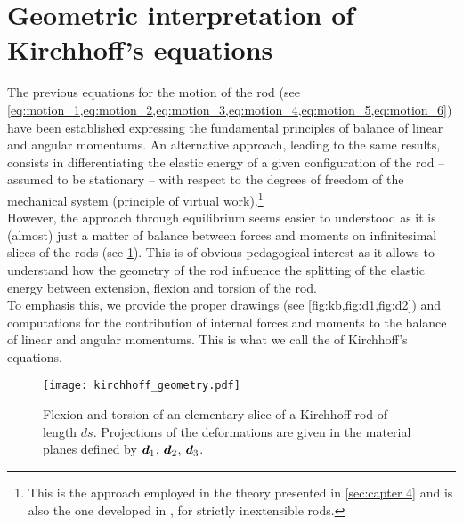 \clearpage
\section{Geometric interpretation of Kirchhoff's equations}

The previous equations for the motion of the rod (see \cref{eq:motion_1,eq:motion_2,eq:motion_3,eq:motion_4,eq:motion_5,eq:motion_6}) have been established expressing the fundamental principles of balance of linear and angular momentums. An alternative approach, leading to the same results, consists in differentiating the elastic energy of a given configuration of the rod -- assumed to be stationary -- with respect to the degrees of freedom of the mechanical system (principle of virtual work).\footnote{This is the approach employed in the theory presented in \cref{sec:capter 4} and is also the one developed in \cite{Audoly2010}, for strictly inextensible rods.} 
\\
However, the approach through equilibrium seems easier to understood as it is (almost) just a matter of balance between forces and moments on infinitesimal slices of the rods (see \cref{fig:slice}). This is of obvious pedagogical interest as it allows to understand how the geometry of the rod influence the splitting of the elastic energy between extension, flexion and torsion of the rod.
\\
To emphasis this, we provide the proper drawings (see \cref{fig:kb,fig:d1,fig:d2}) and computations for the contribution of internal forces and moments to the balance of linear and angular momentums. This is what we call the  of Kirchhoff's equations.

\begin{figure}[h]
	\centering
	\texttt{[image: kirchhoff\_geometry.pdf]}
	\caption{Flexion and torsion of an elementary slice of a Kirchhoff rod of length $ds$. Projections of the deformations are given in the material planes defined by $\boldsymbol{d}_1$, $\boldsymbol{d}_2$, $\boldsymbol{d}_3$.}
	\label{fig:slice}
\end{figure} 

